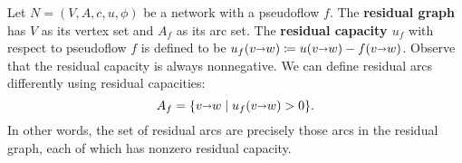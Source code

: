 \documentclass[11pt]{article}
\makeatletter
\def\eps{\varepsilon}
\def\fsupply{\phi}
\def\arcto{\mathord\shortrightarrow}
\def\arc#1#2{#1\arcto#2}
\theoremstyle{plain}
\numberwithin{figure}{section}
\def\EMPH#1{\textbf{\boldmath #1}}
\def\n@te#1{\textsf{\boldmath \textbf{$\langle\!\langle$#1$\rangle\!\rangle$}}\leavevmode}
\def\note#1{\textcolor{red}{\n@te{#1}}}
\makeatother
\begin{document}
Let $N = (V,A,c,u,\fsupply)$ be a network with a pseudoflow $f$.
The \EMPH{residual graph} has $V$ as its vertex set and $A_f$ as its arc set.
%
The \EMPH{residual capacity $u_f$} with respect to
pseudoflow $f$ is defined to be $u_f(\arc vw) \coloneqq u(\arc vw) - f(\arc vw)$.
Observe that the residual capacity is always nonnegative.
We can define residual arcs differently using residual capacities:
\[
A_f = \{\arc vw \mid u_f(\arc vw) > 0\}.
\]
In other words, the set of residual arcs  are precisely those arcs in the residual graph, each of which has nonzero residual capacity.
%
%
%

%
%
%
\end{document}
